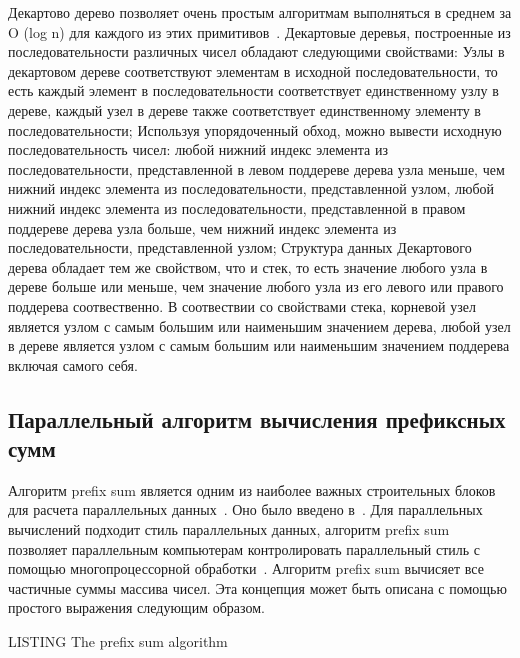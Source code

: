 \documentclass[specification,annotation]{itmo-student-thesis}
\begin{document}
Декартово дерево позволяет очень простым алгоритмам выполняться в среднем за O (log n) для каждого из этих примитивов~\cite{cartesian-tree}. Декартовые деревья, построенные из последовательности различных чисел обладают следующими свойствами: Узлы в декартовом дереве соответствуют элементам в исходной последовательности, то есть каждый элемент в последовательности соответствует единственному узлу в дереве, каждый узел в дереве также соответствует единственному элементу в последовательности; Используя упорядоченный обход, можно вывести исходную последовательность чисел: любой нижний индекс элемента из последовательности, представленной в левом поддереве дерева узла меньше, чем нижний индекс элемента из последовательности, представленной узлом, любой нижний индекс элемента из последовательности, представленной в правом поддереве дерева узла больше, чем нижний индекс элемента из последовательности, представленной узлом; Структура данных Декартового дерева обладает тем же свойством, что и стек, то есть значение любого узла в дереве больше или меньше, чем значение любого узла из его левого или правого поддерева соотвественно. В соотвествии со свойствами стека, корневой узел является узлом с самым большим или наименьшим значением дерева, любой узел в дереве является узлом с самым большим или наименьшим значением поддерева включая самого себя.


\subsection{Параллельный алгоритм вычисления префиксных сумм}


Алгоритм prefix sum является одним из наиболее важных строительных блоков для расчета параллельных данных~\cite{sengupta06}. Оно было введено в~\cite{hillis86}. Для параллельных вычислений подходит стиль параллельных данных, алгоритм prefix sum позволяет параллельным компьютерам контролировать параллельный стиль с помощью многопроцессорной обработки~\cite{hillis86}. Алгоритм prefix sum вычисяет все частичные суммы массива чисел. Эта концепция может быть описана с помощью простого выражения следующим образом.

\begin{algorithm}[h!]
	\caption{LISTING The prefix sum algorithm}
	
	\begin{algorithmic}[1]
		
    				\EndIf
				
			\EndFor
			
		\EndFor
	\end{algorithmic}
\end{algorithm}
\end{document}
